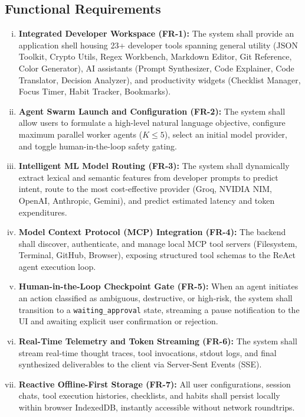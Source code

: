 \documentclass[12pt,a4paper]{report}
\begin{document}
\subsection{Functional Requirements}
\begin{enumerate}[(i)]\setlength{\itemsep}{1.5pt}\setlength{\parsep}{0pt}\setlength{\topsep}{2pt}
    \item \textbf{Integrated Developer Workspace (FR-1):} The system shall provide an application shell housing 23+ developer tools spanning general utility (JSON Toolkit, Crypto Utils, Regex Workbench, Markdown Editor, Git Reference, Color Generator), AI assistants (Prompt Synthesizer, Code Explainer, Code Translator, Decision Analyzer), and productivity widgets (Checklist Manager, Focus Timer, Habit Tracker, Bookmarks).
    \item \textbf{Agent Swarm Launch and Configuration (FR-2):} The system shall allow users to formulate a high-level natural language objective, configure maximum parallel worker agents ($K \le 5$), select an initial model provider, and toggle human-in-the-loop safety gating.
    \item \textbf{Intelligent ML Model Routing (FR-3):} The system shall dynamically extract lexical and semantic features from developer prompts to predict intent, route to the most cost-effective provider (Groq, NVIDIA NIM, OpenAI, Anthropic, Gemini), and predict estimated latency and token expenditures.
    \item \textbf{Model Context Protocol (MCP) Integration (FR-4):} The backend shall discover, authenticate, and manage local MCP tool servers (Filesystem, Terminal, GitHub, Browser), exposing structured tool schemas to the ReAct agent execution loop.
    \item \textbf{Human-in-the-Loop Checkpoint Gate (FR-5):} When an agent initiates an action classified as ambiguous, destructive, or high-risk, the system shall transition to a \texttt{waiting\_approval} state, streaming a pause notification to the UI and awaiting explicit user confirmation or rejection.
    \item \textbf{Real-Time Telemetry and Token Streaming (FR-6):} The system shall stream real-time thought traces, tool invocations, stdout logs, and final synthesized deliverables to the client via Server-Sent Events (SSE).
    \item \textbf{Reactive Offline-First Storage (FR-7):} All user configurations, session chats, tool execution histories, checklists, and habits shall persist locally within browser IndexedDB, instantly accessible without network roundtrips.
\end{enumerate}
\end{document}
